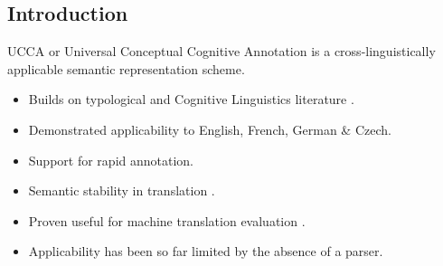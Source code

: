 \documentclass[a0,portrait]{a0poster}
\begin{document}
\begin{multicols}{2} %


\color{Black} %

\section*{Introduction}

\setlength{\columnsep}{1cm}

\begin{table}
  \vspace{-2cm}
  \begin{adjustbox}{margin=2mm,frame}
  \end{adjustbox}
\end{table}

UCCA or Universal Conceptual Cognitive Annotation \cite{abend2013universal}
is a cross-linguistically applicable semantic representation scheme.
\begin{itemize}
 \item Builds on typological \cite{Dixon:basic}
 	and Cognitive Linguistics literature \cite{croft2004cognitive}.
 \item Demonstrated applicability to English, French, German \& Czech.
 \item Support for rapid annotation.
 \item Semantic stability in translation \cite{sulem2015conceptual}.
 \item Proven useful for machine translation evaluation \cite{birch2016hume}.
 \item Applicability has been so far limited by the absence of a parser.
\end{itemize}


\end{multicols}
\end{document}
